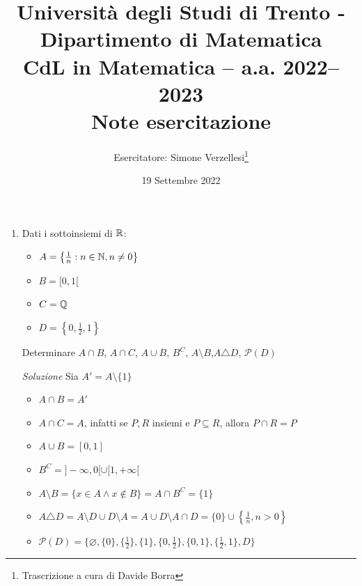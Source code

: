 \documentclass{article}
\title{Università degli Studi di Trento - Dipartimento di Matematica\\
CdL in Matematica – a.a. 2022–2023\\ Note esercitazione}
\author{Esercitatore: Simone Verzellesi\thanks{Trascrizione a cura di Davide Borra}}
\date{19 Settembre 2022}
\begin{document}
\maketitle
{}
\begin{enumerate}[label=\textbf{Esercizio 1.\arabic*.},itemindent=*]
    \item Dati i sottoinsiemi di $\mathbb{R}$:
    \begin{itemize}
        \item $A=\left\{\frac{1}{n}:n\in \mathbb{N}, n\neq 0\right\}$
        \item $B=[0,1[$
        \item $C=\mathbb{Q}$
        \item $D=\left\{0,\frac{1}{2},1\right\}$
    \end{itemize}
    Determinare $A\cap B$, $A\cap C$, $A\cup B$, $B^C$, $A\setminus B$,$A\triangle D$, $\mathcal{P}(D)$
    \item[\textit{\large Soluzione}]
    Sia $A'=A\setminus\{1\}$
    \begin{itemize}
        \item $A\cap B=A'$
        \item $A\cap C=A$, infatti se $P,R$ insiemi e $P\subseteq R$, allora $P\cap R=P$
        \item $A\cup B=[0,1]$
        \item $B^C=]-\infty,0[\cup[1,+\infty[$
        \item $A\setminus B=\{x\in A \land x \notin B\}=A\cap B^C=\{1\}$
        \item $A\triangle D=A\setminus D\cup D\setminus A=A\cup D \setminus A\cap D=\{0\}\cup \left\{\frac{1}{n}, n>0\right\}$
        \item $\mathcal{P}(D)=\{\varnothing, \{0\}, \{\frac{1}{2}\}, \{1\}, \{0, \frac{1}{2}\}, \{0,1\}, \{\frac{1}{2}, 1\}, D\}$
    \end{itemize}
    

\end{enumerate}
\end{document}
